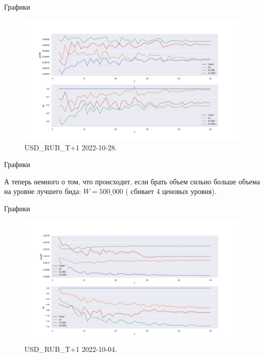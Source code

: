 \documentclass[aspectratio=169]{beamer}
\begin{document}
    \begin{frame}{Графики}
    
        \begin{figure}  
            \centering
            \includegraphics[width=0.83\linewidth]{USD_RUB_T+1 2022-10-28 T = 50 W = 500}
            \caption{USD\_RUB\_T+1 2022-10-28. }
        \end{figure}

    \end{frame}


    \begin{frame}{Графики}
    
        А теперь немного о том, что происходит, если брать объем сильно больше объема на уровне лучшего бида:  $W = 500\_000$ ( сбивает 4 ценовых уровня).

    \end{frame}


    \begin{frame}{Графики}

        \begin{figure}  
            \centering
            \includegraphics[width=0.83\linewidth]{USD_RUB_T+1 2022-10-04 T = 50 W = 500, x10000}
            \caption{USD\_RUB\_T+1 2022-10-04. }
        \end{figure}
        
    \end{frame}
\end{document}
